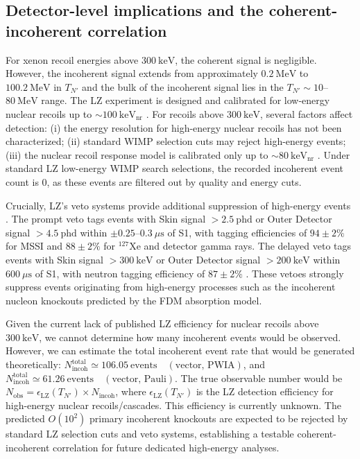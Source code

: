 \documentclass[aps,twocolumn,superscriptaddress,groupedaddress,nofootinbib,floatfix]{revtex4}
\newcommand{\keVnr}{\text{keV}_{\text{nr}}}
\begin{document}
\subsection{Detector-level implications and the coherent-incoherent correlation}

For xenon recoil energies above $300\ \text{keV}$, the coherent signal is negligible. However, the incoherent signal extends from approximately $0.2\ \text{MeV}$ to $100.2\ \text{MeV}$ in $T_{N'}$ and the bulk of the incoherent signal lies in the $T_{N'}\sim10$--$80\ \text{MeV}$ range. The LZ experiment is designed and calibrated for low-energy nuclear recoils up to $\sim100\ \keVnr$ \cite{LZ2026}. For recoils above $300\ \text{keV}$, several factors affect detection: (i) the energy resolution for high-energy nuclear recoils has not been characterized; (ii) standard WIMP selection cuts may reject high-energy events; (iii) the nuclear recoil response model is calibrated only up to $\sim80\ \keVnr$ \cite{LZ2026}. Under standard LZ low-energy WIMP search selections, the recorded incoherent event count is 0, as these events are filtered out by quality and energy cuts.

Crucially, LZ's veto systems provide additional suppression of high-energy events \cite{LZ2026}. The prompt veto tags events with Skin signal $>2.5\ \text{phd}$ or Outer Detector signal $>4.5\ \text{phd}$ within $\pm0.25$--$0.3\ \mu\text{s}$ of S1, with tagging efficiencies of $94\pm2\%$ for MSSI and $88\pm2\%$ for $^{127}\text{Xe}$ and detector gamma rays. The delayed veto tags events with Skin signal $>300\ \text{keV}$ or Outer Detector signal $>200\ \text{keV}$ within $600\ \mu\text{s}$ of S1, with neutron tagging efficiency of $87\pm2\%$ \cite{LZ2026}. These vetoes strongly suppress events originating from high-energy processes such as the incoherent nucleon knockouts predicted by the FDM absorption model.

Given the current lack of published LZ efficiency for nuclear recoils above $300\ \text{keV}$, we cannot determine how many incoherent events would be observed. However, we can estimate the total incoherent event rate that would be generated theoretically: $N_{\text{incoh}}^{\text{total}}\simeq106.05\ \text{events} \quad (\text{vector, PWIA})$, and $N_{\text{incoh}}^{\text{total}}\simeq61.26\ \text{events} \quad (\text{vector, Pauli})$. 
The true observable number would be $N_{\text{obs}}=\epsilon_{\text{LZ}}(T_{N'})\times N_{\text{incoh}}$, where $\epsilon_{\text{LZ}}(T_{N'})$ is the LZ detection efficiency for high-energy nuclear recoils/cascades. This efficiency is currently unknown. The predicted $O(10^2)$ primary incoherent knockouts are expected to be rejected by standard LZ selection cuts and veto systems, establishing a testable coherent-incoherent correlation for future dedicated high-energy analyses.
\end{document}
